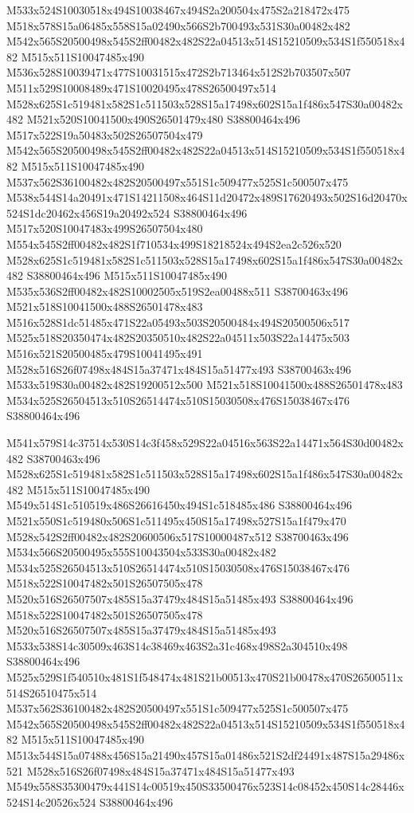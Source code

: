 \documentclass{article}
\begin{document}
\begin{multicols}{2}
M533x524S10030518x494S10038467x494S2a200504x475S2a218472x475 M518x578S15a06485x558S15a02490x566S2b700493x531S30a00482x482 M542x565S20500498x545S2ff00482x482S22a04513x514S15210509x534S1f550518x482 M515x511S10047485x490 M536x528S10039471x477S10031515x472S2b713464x512S2b703507x507 M511x529S10008489x471S10020495x478S26500497x514 M528x625S1c519481x582S1c511503x528S15a17498x602S15a1f486x547S30a00482x482 M521x520S10041500x490S26501479x480 S38800464x496 M517x522S19a50483x502S26507504x479 M542x565S20500498x545S2ff00482x482S22a04513x514S15210509x534S1f550518x482 M515x511S10047485x490 M537x562S36100482x482S20500497x551S1c509477x525S1c500507x475 M538x544S14a20491x471S14211508x464S11d20472x489S17620493x502S16d20470x524S1dc20462x456S19a20492x524 S38800464x496 M517x520S10047483x499S26507504x480 M554x545S2ff00482x482S1f710534x499S18218524x494S2ea2c526x520 M528x625S1c519481x582S1c511503x528S15a17498x602S15a1f486x547S30a00482x482 S38800464x496 M515x511S10047485x490 M535x536S2ff00482x482S10002505x519S2ea00488x511 S38700463x496 M521x518S10041500x488S26501478x483 M516x528S1dc51485x471S22a05493x503S20500484x494S20500506x517 M525x518S20350474x482S20350510x482S22a04511x503S22a14475x503 M516x521S20500485x479S10041495x491 M528x516S26f07498x484S15a37471x484S15a51477x493 S38700463x496 M533x519S30a00482x482S19200512x500 M521x518S10041500x488S26501478x483 M534x525S26504513x510S26514474x510S15030508x476S15038467x476 S38800464x496

M541x579S14c37514x530S14c3f458x529S22a04516x563S22a14471x564S30d00482x482 S38700463x496 M528x625S1c519481x582S1c511503x528S15a17498x602S15a1f486x547S30a00482x482 M515x511S10047485x490 M549x514S1c510519x486S26616450x494S1c518485x486 S38800464x496 M521x550S1c519480x506S1c511495x450S15a17498x527S15a1f479x470 M528x542S2ff00482x482S20600506x517S10000487x512 S38700463x496 M534x566S20500495x555S10043504x533S30a00482x482 M534x525S26504513x510S26514474x510S15030508x476S15038467x476 M518x522S10047482x501S26507505x478 M520x516S26507507x485S15a37479x484S15a51485x493 S38800464x496 M518x522S10047482x501S26507505x478 M520x516S26507507x485S15a37479x484S15a51485x493 M533x538S14c30509x463S14c38469x463S2a31c468x498S2a304510x498 S38800464x496 M525x529S1f540510x481S1f548474x481S21b00513x470S21b00478x470S26500511x514S26510475x514 M537x562S36100482x482S20500497x551S1c509477x525S1c500507x475 M542x565S20500498x545S2ff00482x482S22a04513x514S15210509x534S1f550518x482 M515x511S10047485x490 M513x544S15a07488x456S15a21490x457S15a01486x521S2df24491x487S15a29486x521 M528x516S26f07498x484S15a37471x484S15a51477x493 M549x558S35300479x441S14c00519x450S33500476x523S14c08452x450S14c28446x524S14c20526x524 S38800464x496


\end{multicols}
\end{document}
